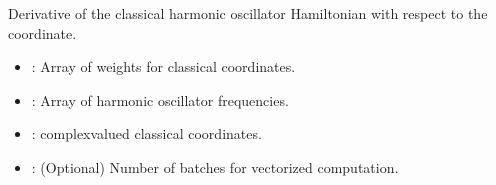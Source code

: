 \documentclass[letterpaper,10pt,english]{sphinxmanual}
\begin{document}
\begin{fulllineitems}
\label{\detokenize{software_reference/ingredients/ingredients:qc_lab.ingredients.harmonic_oscillator_dh_c_dzc}}
\pysigstartsignatures
\pysiglinewithargsret
{}
{\sphinxparamcomma {}\sphinxparamcomma {}\sphinxparamcomma {}}
{}
\pysigstopsignatures
\sphinxAtStartPar
Derivative of the classical harmonic oscillator Hamiltonian with respect to the  coordinate.
\begin{description}
\begin{itemize}
\item {} 
\sphinxAtStartPar
{}: Array of weights for classical coordinates.

\item {} 
\sphinxAtStartPar
{}: Array of harmonic oscillator frequencies.

\end{itemize}

\begin{itemize}
\item {} 
\sphinxAtStartPar
{}: complex\sphinxhyphen{}valued classical coordinates.

\item {} 
\sphinxAtStartPar
{}: (Optional) Number of batches for vectorized computation.

\end{itemize}

\end{description}

\end{fulllineitems}

\end{document}
